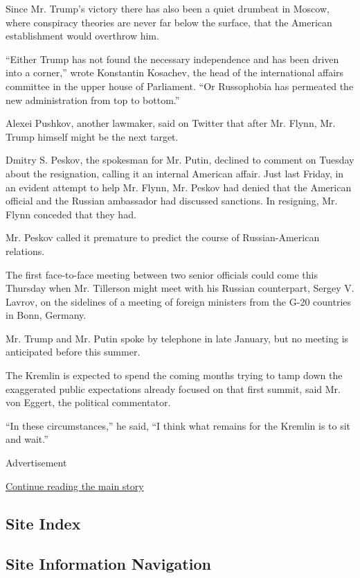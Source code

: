 Since Mr. Trump's victory there has also been a quiet drumbeat in
Moscow, where conspiracy theories are never far below the surface, that
the American establishment would overthrow him.

``Either Trump has not found the necessary independence and has been
driven into a corner,'' wrote Konstantin Kosachev, the head of the
international affairs committee in the upper house of Parliament. ``Or
Russophobia has permeated the new administration from top to bottom.''

Alexei Pushkov, another lawmaker, said on Twitter that after Mr. Flynn,
Mr. Trump himself might be the next target.

Dmitry S. Peskov, the spokesman for Mr. Putin, declined to comment on
Tuesday about the resignation, calling it an internal American affair.
Just last Friday, in an evident attempt to help Mr. Flynn, Mr. Peskov
had denied that the American official and the Russian ambassador had
discussed sanctions. In resigning, Mr. Flynn conceded that they had.

Mr. Peskov called it premature to predict the course of Russian-American
relations.

The first face-to-face meeting between two senior officials could come
this Thursday when Mr. Tillerson might meet with his Russian
counterpart, Sergey V. Lavrov, on the sidelines of a meeting of foreign
ministers from the G-20 countries in Bonn, Germany.

Mr. Trump and Mr. Putin spoke by telephone in late January, but no
meeting is anticipated before this summer.

The Kremlin is expected to spend the coming months trying to tamp down
the exaggerated public expectations already focused on that first
summit, said Mr. von Eggert, the political commentator.

``In these circumstances,'' he said, ``I think what remains for the
Kremlin is to sit and wait.''

Advertisement

\protect\hyperlink{after-bottom}{Continue reading the main story}

\hypertarget{site-index}{%
\subsection{Site Index}\label{site-index}}

\hypertarget{site-information-navigation}{%
\subsection{Site Information
Navigation}\label{site-information-navigation}}

